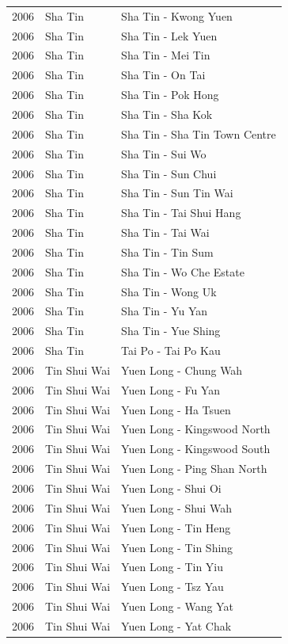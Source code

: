 \begin{longtable}{p{1.2cm}p{3cm}p{7cm}}
2006 & Sha Tin & Sha Tin - Kwong Yuen \\
2006 & Sha Tin & Sha Tin - Lek Yuen \\
2006 & Sha Tin & Sha Tin - Mei Tin \\
2006 & Sha Tin & Sha Tin - On Tai \\
2006 & Sha Tin & Sha Tin - Pok Hong \\
2006 & Sha Tin & Sha Tin - Sha Kok \\
2006 & Sha Tin & Sha Tin - Sha Tin Town Centre \\
2006 & Sha Tin & Sha Tin - Sui Wo \\
2006 & Sha Tin & Sha Tin - Sun Chui \\
2006 & Sha Tin & Sha Tin - Sun Tin Wai \\
2006 & Sha Tin & Sha Tin - Tai Shui Hang \\
2006 & Sha Tin & Sha Tin - Tai Wai \\
2006 & Sha Tin & Sha Tin - Tin Sum \\
2006 & Sha Tin & Sha Tin - Wo Che Estate \\
2006 & Sha Tin & Sha Tin - Wong Uk \\
2006 & Sha Tin & Sha Tin - Yu Yan \\
2006 & Sha Tin & Sha Tin - Yue Shing \\
2006 & Sha Tin & Tai Po - Tai Po Kau \\
2006 & Tin Shui Wai & Yuen Long - Chung Wah \\
2006 & Tin Shui Wai & Yuen Long - Fu Yan \\
2006 & Tin Shui Wai & Yuen Long - Ha Tsuen \\
2006 & Tin Shui Wai & Yuen Long - Kingswood North \\
2006 & Tin Shui Wai & Yuen Long - Kingswood South \\
2006 & Tin Shui Wai & Yuen Long - Ping Shan North \\
2006 & Tin Shui Wai & Yuen Long - Shui Oi \\
2006 & Tin Shui Wai & Yuen Long - Shui Wah \\
2006 & Tin Shui Wai & Yuen Long - Tin Heng \\
2006 & Tin Shui Wai & Yuen Long - Tin Shing \\
2006 & Tin Shui Wai & Yuen Long - Tin Yiu \\
2006 & Tin Shui Wai & Yuen Long - Tsz Yau \\
2006 & Tin Shui Wai & Yuen Long - Wang Yat \\
2006 & Tin Shui Wai & Yuen Long - Yat Chak \\

\end{longtable}

